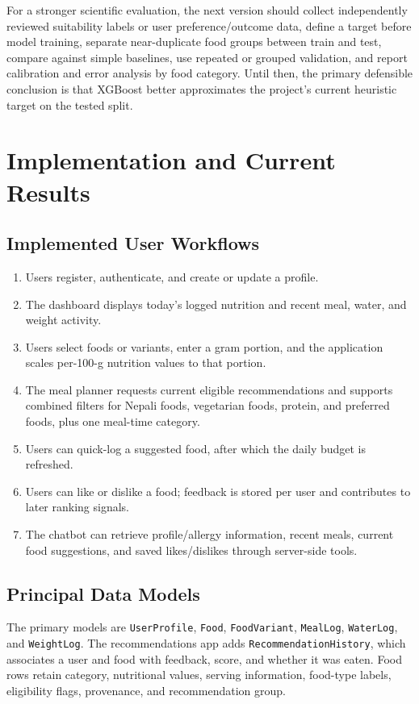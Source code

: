 \documentclass[12pt,a4paper]{report}
\begin{document}
For a stronger scientific evaluation, the next version should collect independently
reviewed suitability labels or user preference/outcome data, define a target before model
training, separate near-duplicate food groups between train and test, compare against
simple baselines, use repeated or grouped validation, and report calibration and error
analysis by food category. Until then, the primary defensible conclusion is that XGBoost
better approximates the project's current heuristic target on the tested split.

\chapter{Implementation and Current Results}
\section{Implemented User Workflows}
\begin{enumerate}
  \item Users register, authenticate, and create or update a profile.
  \item The dashboard displays today's logged nutrition and recent meal, water, and
        weight activity.
  \item Users select foods or variants, enter a gram portion, and the application scales
        per-100-g nutrition values to that portion.
  \item The meal planner requests current eligible recommendations and supports
        combined filters for Nepali foods, vegetarian foods, protein, and preferred foods,
        plus one meal-time category.
  \item Users can quick-log a suggested food, after which the daily budget is refreshed.
  \item Users can like or dislike a food; feedback is stored per user and contributes to
        later ranking signals.
  \item The chatbot can retrieve profile/allergy information, recent meals, current food
        suggestions, and saved likes/dislikes through server-side tools.
\end{enumerate}

\section{Principal Data Models}
The primary models are \texttt{UserProfile}, \texttt{Food}, \texttt{FoodVariant},
\texttt{MealLog}, \texttt{WaterLog}, and \texttt{WeightLog}. The recommendations app
adds \texttt{RecommendationHistory}, which associates a user and food with feedback,
score, and whether it was eaten. Food rows retain category, nutritional values, serving
information, food-type labels, eligibility flags, provenance, and recommendation group.
\end{document}
